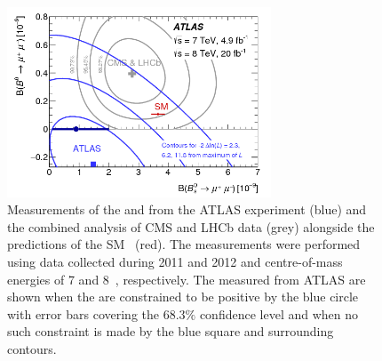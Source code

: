 \begin{figure}[tbp]
    \centering
        \includegraphics[width=0.7\textwidth]{./Figs/Introduction/contour_plot.png}
        \caption{Measurements of the \bdmumu \BF and \bsmumu \BF from the ATLAS experiment (blue) and the combined analysis of CMS and LHCb data (grey) alongside the predictions of the SM~\cite{Aaboud:2016ire} (red). The measurements were performed using data collected during 2011 and 2012 and centre-of-mass energies of 7 and 8~\tev, respectively. The measured \BFs from ATLAS are shown when the \BFs are constrained to be positive by the blue circle with error bars covering the 68.3$\%$ confidence level and when no such constraint is made by the blue square and surrounding contours.}
        \label{fig:atlasCMSLHCbcomparison}
\end{figure}


